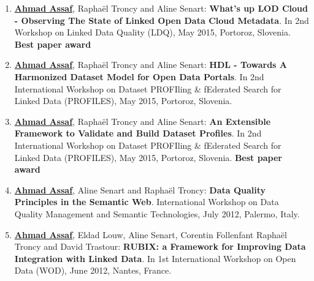 \begin{enumerate}
\item \underline{\textbf{Ahmad Assaf}}, {R}apha{\"e}l {T}roncy and {A}line {S}enart: \textbf{{W}hat's up {LOD} Cloud - Observing The State of Linked Open Data Cloud Metadata}. In 2nd Workshop on Linked Data Quality (LDQ), May 2015, {P}ortoroz, {S}lovenia. \textbf{Best paper award}
\item \underline{\textbf{Ahmad Assaf}}, {R}apha{\"e}l {T}roncy and {A}line {S}enart: \textbf{{HDL} - Towards A Harmonized Dataset Model for Open Data Portals}. In 2nd {I}nternational {W}orkshop on {D}ataset {PROFI}ling \& f{E}derated {S}earch for {L}inked {D}ata (PROFILES), May 2015, {P}ortoroz, {S}lovenia.
\item \underline{\textbf{Ahmad Assaf}}, {R}apha{\"e}l {T}roncy and {A}line {S}enart: \textbf{{A}n Extensible Framework to Validate and Build Dataset Profiles}. In 2nd {I}nternational {W}orkshop on {D}ataset {PROFI}ling \& f{E}derated {S}earch for {L}inked {D}ata (PROFILES), May 2015, {P}ortoroz, {S}lovenia. \textbf{Best paper award}
\item \underline{\textbf{Ahmad Assaf}}, {A}line {S}enart and {R}apha{\"e}l {T}roncy: \textbf{{D}ata Quality Principles in the Semantic Web}. International Workshop on Data Quality Management and Semantic Technologies, July 2012, {P}alermo, {I}taly.
\item \underline{\textbf{Ahmad Assaf}}, {E}ldad {L}ouw, {A}line {S}enart, {C}orentin {F}ollenfant {R}apha{\"e}l {T}roncy and {D}avid {T}rastour: \textbf{{RUBIX}: a Framework for Improving Data Integration with Linked Data}. In 1st International Workshop on Open Data (WOD), June 2012, {N}antes, {F}rance.
\end{enumerate}